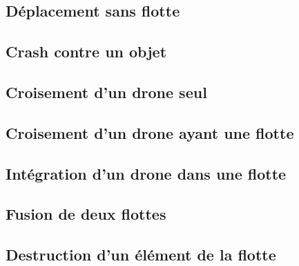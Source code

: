 \documentclass[11pt]{report}
\begin{document}
\subsection{Déplacement sans flotte}

\subsection{Crash contre un objet}

\subsection{Croisement d'un drone seul}

\subsection{Croisement d'un drone ayant une flotte}

\subsection{Intégration d'un drone dans une flotte}

\subsection{Fusion de deux flottes}

\subsection{Destruction d'un élément de la flotte}
\end{document}
